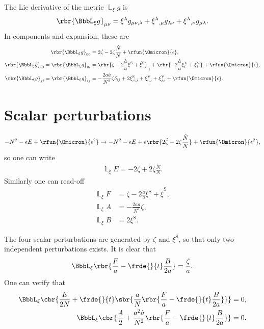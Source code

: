 \documentclass[a4paper,11pt]{article}
\begin{document}
The Lie derivative of the metric $\BbbL_{\xi} g$ is
\begin{align}
\rbr{\BbbL_{\xi} g}_{\mu\nu} =
\xi^\lambda g_{\mu\nu,\lambda} + 
\xi^{\lambda}{}_{,\mu} g_{\lambda\nu} +
\xi^{\lambda}{}_{,\nu} g_{\mu\lambda}.
\end{align}
In components and expansion, these are
\begin{align}
\rbr{\BbbL_{\xi} g}_{00} &=
2\dot\zeta - 2\zeta \frac{\dot{N}}{N} + \rfun{\Omicron}{\epsilon}, \\
\rbr{\BbbL_{\xi} g}_{i0} = \rbr{\BbbL_{\xi} g}_{0i} &=
\rbr{\zeta-2\frac{\dot{a}}{a}\xi^\text{S}+\dot{\xi}^\text{S}}_{,i} +
\rbr{-2\frac{\dot{a}}{a}\xi^\text{V}_{i}+\dot{\xi}^\text{V}_{i}}
+ \rfun{\Omicron}{\epsilon}, \\
\rbr{\BbbL_{\xi} g}_{ji} = \rbr{\BbbL_{\xi} g}_{ij} &=
-\frac{2a\dot{a}}{N^2} \zeta \delta_{ij} + 2\xi^\text{S}_{,i,j}
+ \xi^\text{V}_{i,j} + \xi^\text{V}_{j,i} + \rfun{\Omicron}{\epsilon}.
\end{align}

\section{Scalar perturbations}



\begin{align}
-N^2 - \epsilon E + \rfun{\Omicron}{\epsilon^2} \to
-N^2 - \epsilon E + \epsilon\rbr{2\dot\zeta - 
2\zeta\frac{\dot{N}}{N}}
+ \rfun{\Omicron}{\epsilon^2},
\end{align}
so one can write
\begin{align}
\BbbL_\xi E = -2 \dot{\zeta} + 2 \zeta \frac{\dot{N}}{N}.
\end{align}
Similarly one can read-off
\begin{align}
\BbbL_\xi F &= \zeta - 2\frac{\dot{a}}{a}\xi^\text{S} + \dot{\xi}^\text{S}, \\
\BbbL_\xi A &= -\frac{2a\dot{a}}{N^2}\zeta, \\
\BbbL_\xi B &= 2\xi^\text{S}.
\end{align}

The four scalar perturbations are generated by $\zeta$ and $\xi^\text{S}$, 
so that only two independent perturbations exists. It is clear that
\begin{align}
\BbbL_\xi\rbr{\frac{F}{a}-\frde{}{t}\frac{B}{2a}} = \frac{\zeta}{a}.
\end{align}
One can verify that
\begin{align}
\BbbL_\xi\cbr{\frac{E}{2N}+
\frde{}{t}\sbr{\frac{a}{N}\rbr{\frac{F}{a}-\frde{}{t}\frac{B}{2a}}}} &= 0, \\
\BbbL_\xi\cbr{\frac{A}{2}+
\frac{a^2 \dot{a}}{N^2}\rbr{\frac{F}{a}-\frde{}{t}\frac{B}{2a}}} &= 0.
\end{align}
\end{document}
